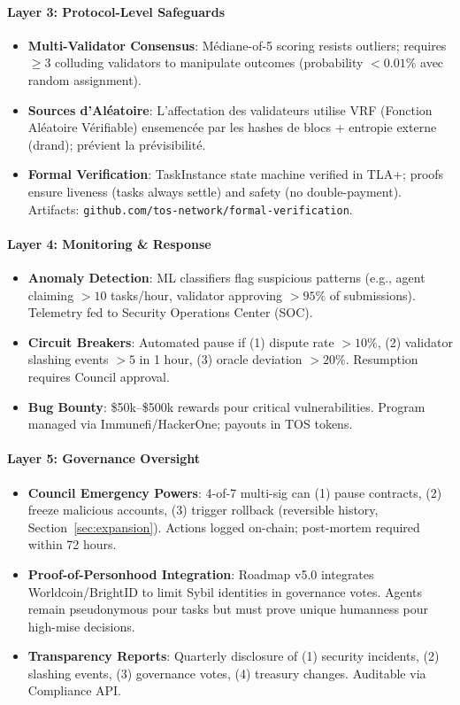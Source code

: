 \documentclass[11pt]{article}
\begin{document}
\paragraph{Layer 3: Protocol-Level Safeguards}
\begin{itemize}[noitemsep]
  \item \textbf{Multi-Validator Consensus}: Médiane-of-5 scoring resists outliers; requires $\geq3$ colluding validators to manipulate outcomes (probability $<0.01\%$ avec random assignment).
  \item \textbf{Sources d'Aléatoire}: L'affectation des validateurs utilise VRF (Fonction Aléatoire Vérifiable) ensemencée par les hashes de blocs + entropie externe (drand); prévient la prévisibilité.
  \item \textbf{Formal Verification}: TaskInstance state machine verified in TLA+; proofs ensure liveness (tasks always settle) and safety (no double-payment). Artifacts: \texttt{github.com/tos-network/formal-verification}.
\end{itemize}

\paragraph{Layer 4: Monitoring \& Response}
\begin{itemize}[noitemsep]
  \item \textbf{Anomaly Detection}: ML classifiers flag suspicious patterns (e.g., agent claiming $>10$ tasks/hour, validator approving $>95\%$ of submissions). Telemetry fed to Security Operations Center (SOC).
  \item \textbf{Circuit Breakers}: Automated pause if (1) dispute rate $>10\%$, (2) validator slashing events $>5$ in 1 hour, (3) oracle deviation $>20\%$. Resumption requires Council approval.
  \item \textbf{Bug Bounty}: \$50k--\$500k rewards pour critical vulnerabilities. Program managed via Immunefi/HackerOne; payouts in TOS tokens.
\end{itemize}

\paragraph{Layer 5: Governance Oversight}
\begin{itemize}[noitemsep]
  \item \textbf{Council Emergency Powers}: 4-of-7 multi-sig can (1) pause contracts, (2) freeze malicious accounts, (3) trigger rollback (reversible history, Section~\ref{sec:expansion}). Actions logged on-chain; post-mortem required within 72 hours.
  \item \textbf{Proof-of-Personhood Integration}: Roadmap v5.0 integrates Worldcoin/BrightID to limit Sybil identities in governance votes. Agents remain pseudonymous pour tasks but must prove unique humanness pour high-mise decisions.
  \item \textbf{Transparency Reports}: Quarterly disclosure of (1) security incidents, (2) slashing events, (3) governance votes, (4) treasury changes. Auditable via Compliance API.
\end{itemize}
\end{document}
